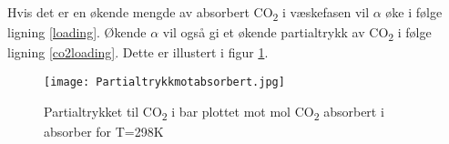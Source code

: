 Hvis det er en økende mengde av absorbert CO\textsubscript{2} i væskefasen vil $\alpha$ øke i følge ligning \ref{loading}. Økende $\alpha$ vil også gi et økende partialtrykk av CO\textsubscript{2} i følge ligning \ref{co2loading}. Dette er illustert i figur \ref{PlotCO2abs}. 

\begin{figure}[h]  
\texttt{[image: Partialtrykkmotabsorbert.jpg]}
\centering
\caption{Partialtrykket til CO\textsubscript{2} i bar plottet mot mol CO\textsubscript{2} absorbert i absorber for T=298K}
\label{PlotCO2abs}
\end{figure}

